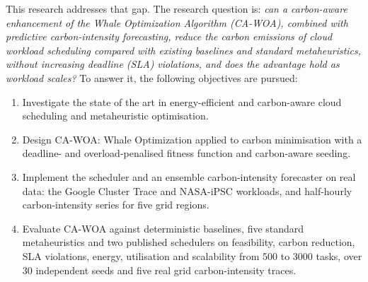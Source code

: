 \documentclass[12pt,a4paper]{article}
\begin{document}
This research addresses that gap. The research question is: \emph{can a carbon-aware enhancement of the Whale
Optimization Algorithm (CA-WOA), combined with predictive carbon-intensity forecasting, reduce the carbon
emissions of cloud workload scheduling compared with existing baselines and standard metaheuristics, without
increasing deadline (SLA) violations, and does the advantage hold as workload scales?} To answer it, the
following objectives are pursued:
\begin{enumerate}
\item Investigate the state of the art in energy-efficient and carbon-aware cloud scheduling and metaheuristic optimisation.
\item Design CA-WOA: Whale Optimization applied to carbon minimisation with a deadline- and overload-penalised fitness function and carbon-aware seeding.
\item Implement the scheduler and an ensemble carbon-intensity forecaster on real data: the Google Cluster
Trace and NASA-iPSC workloads, and half-hourly carbon-intensity series for five grid regions.
\item Evaluate CA-WOA against deterministic baselines, five standard metaheuristics and two published
schedulers on feasibility, carbon reduction, SLA violations, energy, utilisation and scalability from 500 to
3000 tasks, over 30 independent seeds and five real grid carbon-intensity traces.
\end{enumerate}
\end{document}
